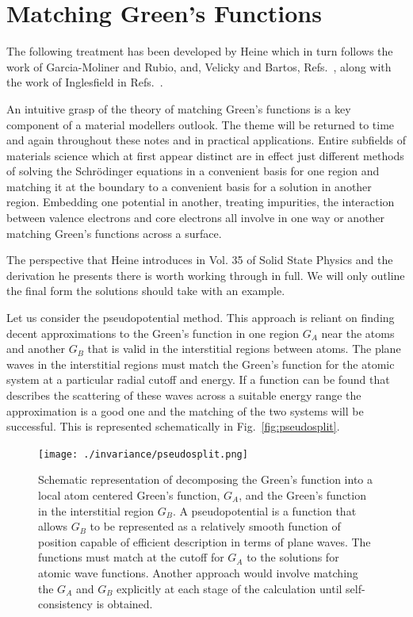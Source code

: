 \section{Matching Green's Functions}
\label{sec:matchinggreens}
The following treatment has been developed by Heine which in turn follows the 
work of Garcia-Moliner and Rubio, and, Velicky and Bartos, Refs.~\cite{garcia69, velicky71, garcia71},
along with the work of Inglesfield in Refs.~\cite{inglesfield71,inglesfield81}.

An intuitive grasp of the theory of matching Green's functions is a key component of a material
modellers outlook. The theme will be returned to time and again throughout these notes and in
practical applications. Entire subfields of materials science which at first appear distinct 
are in effect just different methods of solving the Schr\"odinger equations in a convenient
basis for one region and matching it at the boundary to a convenient basis 
for a solution in another region. Embedding one potential in another, treating impurities,
the interaction between valence electrons and core electrons all
involve in one way or another matching Green's functions across a surface.

The perspective that Heine introduces in Vol. 35 of Solid State Physics and the derivation
he presents there is worth working through in full. We will only outline the final form
the solutions should take with an example.

Let us consider the pseudopotential method.
This approach is reliant on finding decent approximations to the Green's function in one
region $G_{A}$ near the atoms and another $G_{B}$ that is valid in the interstitial
regions between atoms. The plane waves
in the interstitial regions must match the Green's function for the atomic system
at a particular radial cutoff and energy. If a function can be found that 
describes the scattering of these waves across a suitable energy range the approximation 
is a good one and the matching of the two systems will be successful. This
is represented schematically in Fig.~\ref{fig:pseudosplit}.
%
\begin{figure}
\begin{center}
\texttt{[image: ./invariance/pseudosplit.png]}
\caption{Schematic representation of decomposing the Green's function into a local atom centered
Green's function, $G_{A}$, and the Green's function in the interstitial region $G_{B}$.
A pseudopotential is a function that allows $G_{B}$ to be represented as a relatively
smooth function of position capable of efficient description in terms of plane waves.
The functions must match at the cutoff for $G_{A}$ to the solutions for 
atomic wave functions. Another approach would involve matching the $G_{A}$ 
and $G_{B}$ explicitly at each stage of the calculation until self-consistency is obtained.}
\end{center}
\end{figure}

